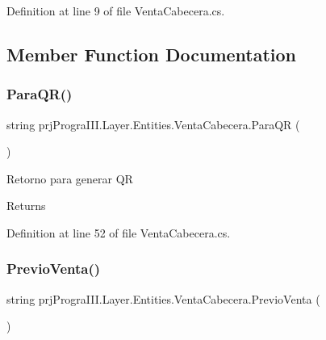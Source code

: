 Definition at line 9 of file Venta\+Cabecera.\+cs.



\subsection{Member Function Documentation}
\hypertarget{classprj_progra_i_i_i_1_1_layer_1_1_entities_1_1_venta_cabecera_a2e03254a397ea3ee8282700399d8d416}{}\label{classprj_progra_i_i_i_1_1_layer_1_1_entities_1_1_venta_cabecera_a2e03254a397ea3ee8282700399d8d416} 
\subsubsection{\texorpdfstring{Para\+Q\+R()}{ParaQR()}}
{\footnotesize\ttfamily string prj\+Progra\+I\+I\+I.\+Layer.\+Entities.\+Venta\+Cabecera.\+Para\+QR (\begin{DoxyParamCaption}{ }\end{DoxyParamCaption})}



Retorno para generar QR 

\begin{DoxyReturn}{Returns}

\end{DoxyReturn}


Definition at line 52 of file Venta\+Cabecera.\+cs.

\hypertarget{classprj_progra_i_i_i_1_1_layer_1_1_entities_1_1_venta_cabecera_a74d25a78b7a948f486fc6c850cea3b43}{}\label{classprj_progra_i_i_i_1_1_layer_1_1_entities_1_1_venta_cabecera_a74d25a78b7a948f486fc6c850cea3b43} 
\subsubsection{\texorpdfstring{Previo\+Venta()}{PrevioVenta()}}
{\footnotesize\ttfamily string prj\+Progra\+I\+I\+I.\+Layer.\+Entities.\+Venta\+Cabecera.\+Previo\+Venta (\begin{DoxyParamCaption}{ }\end{DoxyParamCaption})}



